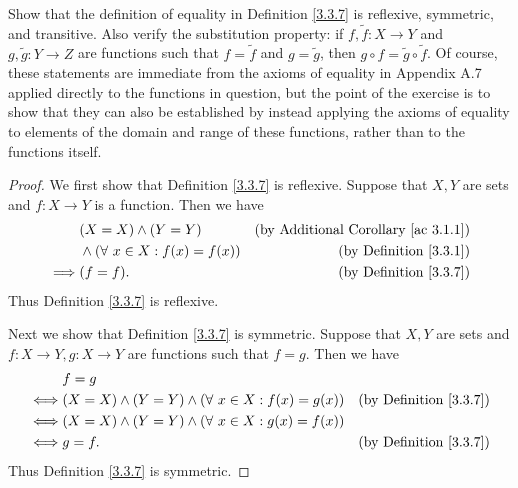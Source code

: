 \begin{exercise}\label{ex 3.3.1}
    Show that the definition of equality in Definition \ref{3.3.7} is reflexive, symmetric, and transitive.
    Also verify the substitution property: if \(f, \tilde{f} : X \to Y\) and \(g, \tilde{g} : Y \to Z\) are functions such that \(f = \tilde{f}\) and \(g = \tilde{g}\), then \(g \circ f = \tilde{g} \circ \tilde{f}\).
    Of course, these statements are immediate from the axioms of equality in Appendix A.7 applied directly to the functions in question, but the point of the exercise is to show that they can also be established by instead applying the axioms of equality to elements of the domain and range of these functions, rather than to the functions itself.
\end{exercise}

\begin{proof}
    We first show that Definition \ref{3.3.7} is reflexive.
    Suppose that \(X, Y\) are sets and \(f : X \to Y\) is a function.
    Then we have
    \begin{align*}
                 & (X = X) \land (Y = Y)                  & \text{(by Additional Corollary \ref{ac 3.1.1})} \\
                 & \land (\forall\ x \in X : f(x) = f(x)) & \text{(by Definition \ref{3.3.1})}              \\
        \implies & (f = f).                               & \text{(by Definition \ref{3.3.7})}
    \end{align*}
    Thus Definition \ref{3.3.7} is reflexive.

    Next we show that Definition \ref{3.3.7} is symmetric.
    Suppose that \(X, Y\) are sets and \(f : X \to Y, g : X \to Y\) are functions such that \(f = g\).
    Then we have
    \begin{align*}
             & f = g                                                                                             \\
        \iff & (X = X) \land (Y = Y) \land (\forall\ x \in X : f(x) = g(x)) & \text{(by Definition \ref{3.3.7})} \\
        \iff & (X = X) \land (Y = Y) \land (\forall\ x \in X : g(x) = f(x))                                      \\
        \iff & g = f.                                                       & \text{(by Definition \ref{3.3.7})}
    \end{align*}
    Thus Definition \ref{3.3.7} is symmetric.


\end{proof}
